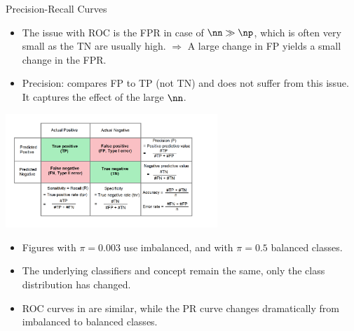 \documentclass[11pt,compress,t,notes=noshow, xcolor=table]{beamer}
\begin{document}
\begin{vbframe}{Precision-Recall Curves}
\framebreak

\begin{itemize}
  \item The issue with ROC is the FPR in case of $\nn \gg \np$, which is often very small as the TN are usually high. \newline
  $\Rightarrow$ A large change in FP yields a small change in the FPR.
  \item Precision: compares FP to TP (not TN) and does not suffer from this issue.
  It captures the effect of the large $\nn$.
\end{itemize}
\hspace*{\fill}\includegraphics[width=0.6\textwidth]{figure_man/roc-confusion_matrix.png}\hspace*{\fill}

\framebreak

\begin{footnotesize}
\vspace{-0.2cm}
\begin{itemize}
  \item Figures with $\pi = 0.003$ use imbalanced, and with $\pi = 0.5$ balanced classes.
  \item The underlying classifiers and concept remain the same, only the class distribution has changed.
  \item ROC curves in are similar, while the PR curve changes dramatically from imbalanced to balanced classes. 
\end{itemize}
\end{footnotesize}
\vspace{-0.4cm}


\end{vbframe}
\end{document}
